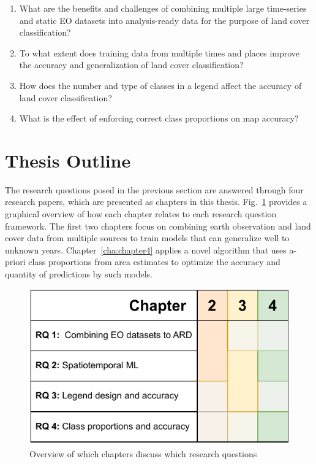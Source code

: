 \begin{enumerate}
\item %
What are the benefits and challenges of combining multiple large time-series and static EO datasets into analysis-ready data for the purpose of land cover classification?
\item %
To what extent does training data from multiple times and places improve the accuracy and generalization of land cover classification?
\item %
How does the number and type of classes in a legend affect the accuracy of land cover classification?
\item %
What is the effect of enforcing correct class proportions on map accuracy?
\end{enumerate}

\section{Thesis Outline}

The research questions posed in the previous section are answered through four research papers, which are presented as chapters in this thesis. Fig.\@~\ref{fig:01_rqs_chapters} provides a graphical overview of how each chapter relates to each research question framework. The first two chapters focus on combining earth observation and land cover data from multiple sources to train models that can generalize well to unknown years. Chapter\@~\ref{cha:chapter4} applies a novel algorithm that uses a-priori class proportions from area estimates to optimize the accuracy and quantity of predictions by such models.

\begin{figure}
    \centering
    \includegraphics[width=\textwidth]{figs_01/fig_rqs_chapters.pdf}
    \caption{Overview of which chapters discuss which research questions}
    \label{fig:01_rqs_chapters}
\end{figure}

